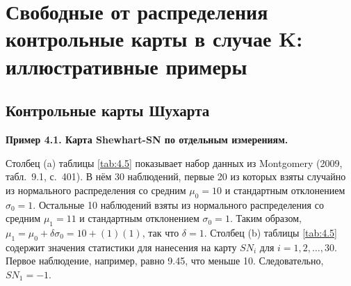\section{Свободные от распределения контрольные карты в случае K: иллюстративные примеры}
\subsection{Контрольные карты Шухарта}

\noindent\textbf{Пример 4.1. Карта Shewhart-SN по отдельным измерениям.}

Столбец (a) таблицы \ref{tab:4.5} показывает набор данных из Montgomery (2009, табл.~9.1, с.~401). В нём 30 наблюдений, первые 20 из которых взяты случайно из нормального распределения со средним \(\mu_0 = 10\) и стандартным отклонением \(\sigma_0 = 1\). Остальные 10 наблюдений взяты из нормального распределения со средним \(\mu_1 = 11\) и стандартным отклонением \(\sigma_0 = 1\). Таким образом, \(\mu_1 = \mu_0 + \delta\sigma_0 = 10 + (1)(1)\), так что \(\delta = 1\). Столбец (b) таблицы \ref{tab:4.5} содержит значения статистики для нанесения на карту \(SN_i\) для \(i = 1, 2, \ldots, 30\). Первое наблюдение, например, равно 9.45, что меньше 10. Следовательно, \(SN_1 = -1\).

